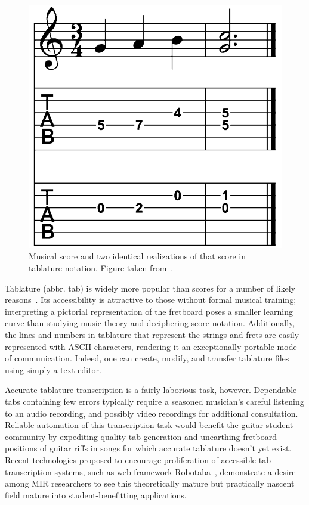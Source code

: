 \documentclass[12pt]{cmuthesis}
\begin{document}
\begin{figure}[!htbp] 
\centering
\includegraphics[scale=0.25]{score-tabs}
\caption{Musical score and two identical realizations of that score in tablature notation. Figure taken from~\cite{barbanchoi2012}.}
\label{fig:score-tabs}
\end{figure}

Tablature (abbr. tab) is widely more popular than scores for a number of likely reasons~\cite{macrae2010}. Its accessibility is attractive to those without formal musical training; interpreting a pictorial representation of the fretboard poses a smaller learning curve than studying music theory and deciphering score notation. Additionally, the lines and numbers in tablature that represent the strings and frets are easily represented with ASCII characters, rendering it an exceptionally portable mode of communication. Indeed, one can create, modify, and transfer tablature files using simply a text editor.

Accurate tablature transcription is a fairly laborious task, however. Dependable tabs containing few errors typically require a seasoned musician's careful listening to an audio recording, and possibly video recordings for additional consultation. Reliable automation of this transcription task would benefit the guitar student community by expediting quality tab generation and unearthing fretboard positions of guitar riffs in songs for which accurate tablature doesn't yet exist. Recent technologies proposed to encourage proliferation of accessible tab transcription systems, such as web framework Robotaba~\cite{burlet2013}, demonstrate a desire among MIR researchers to see this theoretically mature but practically nascent field mature into student-benefitting applications. 
\end{document}
